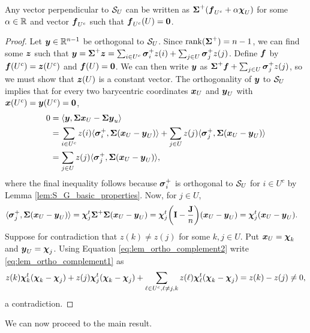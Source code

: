 \begin{lemma}
	\label{lem:S_U_ortho_complement}
	Any vector perpendicular to $\mathcal{S}_U$ can be written as $\boldsymbol{\Sigma}^+(\vb*{f}_{U^c}+\alpha \boldsymbol{\chi}_U)$ for some $\alpha\in\mathbb{R}$ and vector $\vb*{f}_{U^c}$ such that $\vb*{f}_{U^c}(U)=\vb{0}$. 
\end{lemma}
\begin{proof}
	Let $\vb*{y}\in\mathbb{R}^{n-1}$ be orthogonal to $\mathcal{S}_U$. Since $\rank(\boldsymbol{\Sigma}^+)=n-1$, we can find some $\vb*{z}$ such that $\vb*{y}=\boldsymbol{\Sigma}^+\vb*{z}=\sum_{i\in U^c}\vb*{\sigma}_i^+z(i) + \sum_{j\in U}\vb*{\sigma}_j^+z(j)$. Define $\vb*{f}$ by $\vb*{f}(U^c)=\vb*{z}(U^c)$ and $\vb*{f}(U)=\vb{0}$. We can then write $\vb*{y}$ as $\boldsymbol{\Sigma}^+\vb*{f}+\sum_{j\in U}\vb*{\sigma}_j^+z(j)$, so we must show that $\vb*{z}(U)$ is a constant vector. The orthogonality of $\vb*{y}$ to $\mathcal{S}_U$ implies that for every two barycentric coordinates $\vb*{x}_U$ and $\vb*{y}_U$ with $\vb*{x}(U^c)=\vb*{y}(U^c)=\vb{0}$, 
	\begin{align}
	0 &= \langle \vb*{y},\boldsymbol{\Sigma}\vb*{x}_U-\boldsymbol{\Sigma}\vb*{y}_u\rangle \notag \\
	&= \sum_{i\in U^c}z(i) \langle \vb*{\sigma}_i^+,\boldsymbol{\Sigma}(\vb*{x}_U-\vb*{y}_U)\rangle + \sum_{j\in U}z(j)\langle \vb*{\sigma}_j^+,\boldsymbol{\Sigma}(\vb*{x}_U-\vb*{y}_U)\rangle  \notag \\
	&= \sum_{j\in U}z(j)\langle \vb*{\sigma}_j^+,\boldsymbol{\Sigma}(\vb*{x}_U-\vb*{y}_U)\rangle, \label{eq:lem_ortho_complement1}
	\end{align} 
	where the final inequality follows because $\vb*{\sigma}_i^+$ is orthogonal to $\mathcal{S}_U$ for $i\in U^c$ by Lemma \ref{lem:S_G_basic_properties}.
	 Now, for $j\in U$, 
	\begin{align}
	\langle \vb*{\sigma}_j^+,\boldsymbol{\Sigma}(\vb*{x}_U-\vb*{y}_U)\rangle &= \boldsymbol{\chi}_j^t \boldsymbol{\Sigma}^+\boldsymbol{\Sigma}(\vb*{x}_U-\vb*{y}_U) = \boldsymbol{\chi}_j^t \bigg(\vb{I} - \frac{\vb{J}}{n}\bigg)(\vb*{x}_U-\vb*{y}_U) = \boldsymbol{\chi}_j^t (\vb*{x}_U-\vb*{y}_U). \label{eq:lem_ortho_complement2}
	\end{align}
	Suppose for contradiction that $z(k)\neq z(j)$ for some $k,j\in U$. Put $\vb*{x}_U = \boldsymbol{\chi}_k$ and $\vb*{y}_U=\boldsymbol{\chi}_j$. Using Equation  \eqref{eq:lem_ortho_complement2} write \eqref{eq:lem_ortho_complement1} as 
	\begin{align*}
	z(k)\boldsymbol{\chi}_k^t(\boldsymbol{\chi}_k-\boldsymbol{\chi}_j) + z(j)\boldsymbol{\chi}_j^t(\boldsymbol{\chi}_k -\boldsymbol{\chi}_j) + \sum_{\ell\in U^c,\ell\neq j,k}z(\ell)\boldsymbol{\chi}_\ell^t(\boldsymbol{\chi}_k-\boldsymbol{\chi}_j) = z(k)-z(j)\neq 0,
	\end{align*}
	a contradiction. 
\end{proof}

We can now proceed to the main result. 

